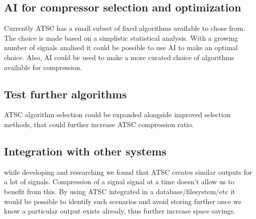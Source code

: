 \documentclass[conference]{IEEEtran}
\begin{document}

\subsection{AI for compressor selection and optimization}

Currently ATSC has a small subset of fixed algorithms available to chose from. The choice is made based on a simplistic statistical analysis. With a growing number of signals analised it could be possible to use AI to make an optimal choice. 
Also, AI could be used to make a more curated choice of algorithms available for compression.


\subsection*{Test further algorithms}

ATSC algorithm selection could be expanded alongside improved selection methods, that could further increase ATSC compression ratio.


\subsection{Integration with other systems}

while developing and researching we found that ATSC creates similar outputs for a lot of signals. Compression of a signal signal at a time doesn't allow us to benefit from this. By using ATSC integrated in a database/filesystem/etc it would be possible
to identify such scenarios and avoid storing further once we know a particular output exists already, thus further increase space savings.

\end{document}

